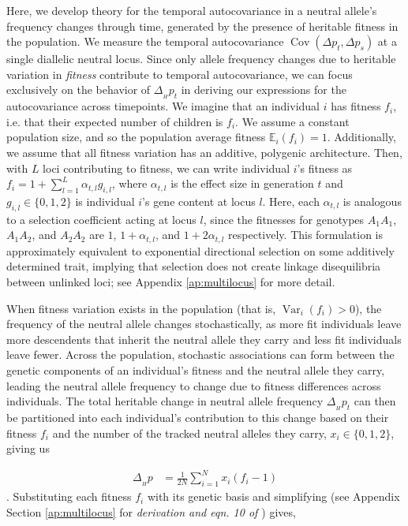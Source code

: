 \documentclass[11pt]{article}
\newcommand{\vb}[1]{{\it \color{blue} #1}}
\newcommand{\E}{\mathbb{E}}
\DeclareMathOperator{\var}{Var}
\DeclareMathOperator{\cov}{Cov}
\begin{document}
Here, we develop theory for the temporal autocovariance in a neutral allele's
frequency changes through time, generated by the presence of heritable fitness
in the population. We measure the temporal autocovariance $\cov(\Delta p_t,
\Delta p_s)$ at a single diallelic neutral locus. Since only allele frequency
changes due to heritable variation in \emph{fitness} contribute to temporal
autocovariance, we can focus exclusively on the behavior of $\Delta_{_H} p_t$
in deriving our expressions for the autocovariance across timepoints. We
imagine that an individual $i$ has fitness $f_i$, i.e. that their expected
number of children is $f_i$. We assume a constant population size, and so the
population average fitness $\E_i(f_i) = 1$. Additionally, we assume that all
fitness variation has an additive, polygenic architecture. Then, with $L$ loci
contributing to fitness, we can write individual $i$'s fitness as $f_i = 1 +
\sum_{l=1}^L \alpha_{t,l} g_{i,l}$, where $\alpha_{t,l}$ is the effect size in
generation $t$ and $g_{i,l} \in \{0, 1, 2\}$ is individual $i$'s gene content
at locus $l$. Here, each $\alpha_{t,l}$ is analogous to a selection
coefficient acting at locus $l$, since the fitnesses for genotypes $A_1 A_1$,
$A_1 A_2$, and $A_2 A_2$ are $1$, $1 + \alpha_{t,l}$, and $1 + 2\alpha_{t,l}$
respectively. This formulation is approximately equivalent to exponential
directional selection on some additively determined trait, implying that
selection does not create linkage disequilibria between unlinked loci; see
Appendix \ref{ap:multilocus} for more detail.

When fitness variation exists in the population (that is, $\var_i(f_i) > 0$),
the frequency of the neutral allele changes stochastically, as more fit
individuals leave more descendents that inherit the neutral allele they carry
and less fit individuals leave fewer. Across the population, stochastic
associations can form between the genetic components of an individual's fitness
and the neutral allele they carry, leading the neutral allele frequency to
change due to fitness differences across individuals. The total heritable
change in neutral allele frequency $\Delta_{_H} p_t$ can then be partitioned
into each individual's contribution to this change based on their fitness $f_i$
and the number of the tracked neutral alleles they carry, $x_i \in \{0, 1,
2\}$, giving us

\begin{align}
  \Delta_{_H} p &= \frac{1}{2N} \sum_{i=1}^N x_i (f_i - 1)
\end{align}
%
\parencite{Santiago1995-hx}. Substituting each fitness $f_i$ with its genetic
basis and simplifying (see Appendix Section \ref{ap:multilocus} for
\vb{derivation and eqn. 10 of \cite{Kirkpatrick2002-aw}}) gives,
\end{document}
